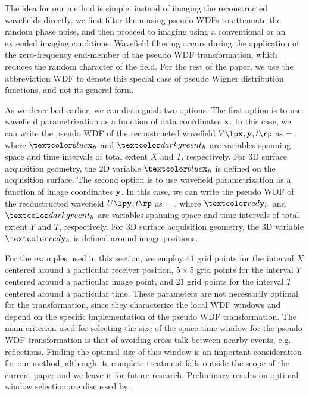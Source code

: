 The idea for our method is simple: instead of imaging the
reconstructed wavefields directly, we first filter them using pseudo
WDFs to attenuate the random phase noise, and then proceed to imaging
using a conventional or an extended imaging conditions.  Wavefield
filtering occurs during the application of the zero-frequency
end-member of the pseudo WDF transformation, which reduces the random
character of the field. For the rest of the paper, we use the
abbreviation WDF to denote this special case of pseudo Wigner
distribution functions, and not its general form.

As we described earlier, we can distinguish two options. The first
option is to use wavefield parametrization as a function of data
coordinates ${\mathbf{x}}$. In this case, we can write the pseudo WDF of the
reconstructed wavefield $\VV{\xm,\ym,\tm}$ as
%
\beq \label{eqn:wxx}
 = \intth \intxh \lb
{}
\rb \;, 
\eeq 
%
where $\xh$ and $\th$ are variables spanning space and time intervals
of total extent $X$ and $T$, respectively. For 3D surface acquisition
geometry, the 2D variable $\xh$ is defined on the acquisition surface.
The second option is to use wavefield parametrization as a function of
image coordinates ${\mathbf{y}}$. In this case, we can write the pseudo WDF of
the reconstructed wavefield $\UU{\ym,\tm}$ as
%
\beq \label{eqn:wyy}
 = \intth \intyh 
{}
 \;,
\eeq
%
where $\yh$ and $\th$ are variables spanning space and time intervals
of total extent $Y$ and $T$, respectively. For 3D surface acquisition
geometry, the 3D variable $\yh$ is defined around image positions.

For the examples used in this section, we employ $41$ grid points for
the interval $X$ centered around a particular receiver position, $5
\times 5$ grid points for the interval $Y$ centered around a
particular image point, and $21$ grid points for the interval $T$
centered around a particular time. These parameters are not
necessarily optimal for the transformation, since they characterize
the local WDF windows and depend on the specific implementation of the
pseudo WDF transformation. The main criterion used for selecting the
size of the space-time window for the pseudo WDF transformation is
that of avoiding cross-talk between nearby events,
e.g. reflections. Finding the optimal size of this window is an
important consideration for our method, although its complete
treatment falls outside the scope of the current paper and we leave it
for future research. Preliminary results on optimal window selection
are discussed by \cite{Borcea.IP.2006}.

